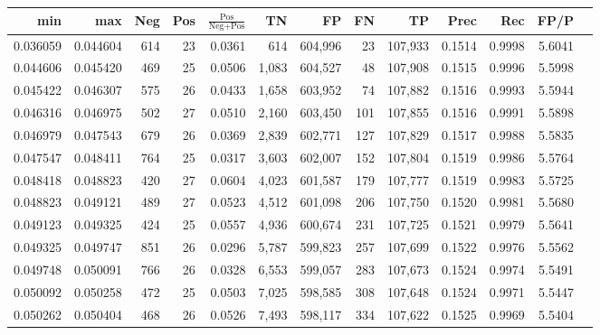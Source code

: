 \begin{tabular}{rrrrrrrrrrrrr}
\toprule
     min &      max & Neg & Pos & $\frac{\text{Pos}}{\text{Neg}+\text{Pos}}$ &      TN &      FP &      FN &      TP &   Prec &    Rec &   FP/P \\
\midrule
0.036059 & 0.044604 & 614 &  23 &                                     0.0361 &     614 & 604,996 &      23 & 107,933 & 0.1514 & 0.9998 & 5.6041 \\
0.044606 & 0.045420 & 469 &  25 &                                     0.0506 &   1,083 & 604,527 &      48 & 107,908 & 0.1515 & 0.9996 & 5.5998 \\
0.045422 & 0.046307 & 575 &  26 &                                     0.0433 &   1,658 & 603,952 &      74 & 107,882 & 0.1516 & 0.9993 & 5.5944 \\
0.046316 & 0.046975 & 502 &  27 &                                     0.0510 &   2,160 & 603,450 &     101 & 107,855 & 0.1516 & 0.9991 & 5.5898 \\
0.046979 & 0.047543 & 679 &  26 &                                     0.0369 &   2,839 & 602,771 &     127 & 107,829 & 0.1517 & 0.9988 & 5.5835 \\
0.047547 & 0.048411 & 764 &  25 &                                     0.0317 &   3,603 & 602,007 &     152 & 107,804 & 0.1519 & 0.9986 & 5.5764 \\
0.048418 & 0.048823 & 420 &  27 &                                     0.0604 &   4,023 & 601,587 &     179 & 107,777 & 0.1519 & 0.9983 & 5.5725 \\
0.048823 & 0.049121 & 489 &  27 &                                     0.0523 &   4,512 & 601,098 &     206 & 107,750 & 0.1520 & 0.9981 & 5.5680 \\
0.049123 & 0.049325 & 424 &  25 &                                     0.0557 &   4,936 & 600,674 &     231 & 107,725 & 0.1521 & 0.9979 & 5.5641 \\
0.049325 & 0.049747 & 851 &  26 &                                     0.0296 &   5,787 & 599,823 &     257 & 107,699 & 0.1522 & 0.9976 & 5.5562 \\
0.049748 & 0.050091 & 766 &  26 &                                     0.0328 &   6,553 & 599,057 &     283 & 107,673 & 0.1524 & 0.9974 & 5.5491 \\
0.050092 & 0.050258 & 472 &  25 &                                     0.0503 &   7,025 & 598,585 &     308 & 107,648 & 0.1524 & 0.9971 & 5.5447 \\
0.050262 & 0.050404 & 468 &  26 &                                     0.0526 &   7,493 & 598,117 &     334 & 107,622 & 0.1525 & 0.9969 & 5.5404 \\

\end{tabular}
